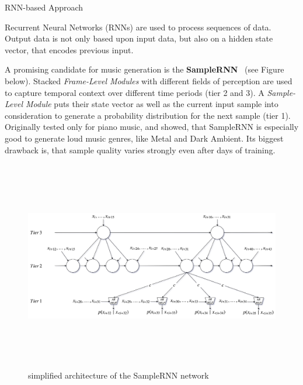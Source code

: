 \documentclass[final,hyperref={pdfpagelabels=false}]{beamer}
\newcommand{\blocktextwidth}{0.93\textwidth}
\begin{document}
\begin{frame}[t]
\begin{columns}[t]
\begin{column}{0.6375\textwidth}
\begin{columns}[T]


\begin{column}{0.486\textwidth}


\begin{block}{RNN-based Approach}
\begin{minipage}[]{\blocktextwidth}
Recurrent Neural Networks (RNNs) are used to process sequences of data.
Output data is not only based upon input data, but also on a hidden state vector, that encodes previous input.

A promising candidate for music generation is the \textbf{SampleRNN}~\cite{mehri2016samplernn} (see Figure below).
Stacked \emph{Frame-Level Modules} with different fields of perception are used to capture temporal context over different time periods (tier 2 and 3).
A \emph{Sample-Level Module} puts their state vector as well as the current input sample into consideration to generate a probability distribution for the next sample (tier 1).
Originally tested only for piano music, \cite{zukowski2018generating} and \cite{carr2018generating} showed, that SampleRNN is especially good to generate loud music genres, like Metal and Dark Ambient.
Its biggest drawback is, that sample quality varies strongly even after days of training.
\begin{figure}[ht]
    \label{fig:samplernn}
    \includegraphics[height=92mm]{samplernn.png}
    \caption*{simplified architecture of the SampleRNN network}
\end{figure}
\end{minipage}
\end{block}





\end{column}
\end{columns}
\end{column}
\end{columns}
\end{frame}
\end{document}

